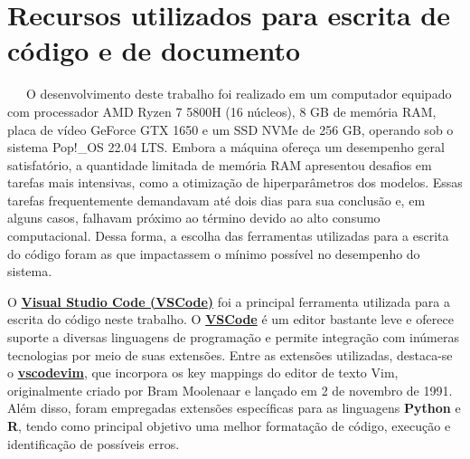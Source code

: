 \documentclass[
  12pt,
  a4paper,
]{scrreprt}
\begin{document}
\section{Recursos utilizados para escrita de código e de
documento}\label{recursos-utilizados-para-escrita-de-cuxf3digo-e-de-documento}

~~~O desenvolvimento deste trabalho foi realizado em um computador
equipado com processador AMD Ryzen 7 5800H (16 núcleos), 8 GB de memória
RAM, placa de vídeo GeForce GTX 1650 e um SSD NVMe de 256 GB, operando
sob o sistema Pop!\_OS 22.04 LTS. Embora a máquina ofereça um desempenho
geral satisfatório, a quantidade limitada de memória RAM apresentou
desafios em tarefas mais intensivas, como a otimização de
hiperparâmetros dos modelos. Essas tarefas frequentemente demandavam até
dois dias para sua conclusão e, em alguns casos, falhavam próximo ao
término devido ao alto consumo computacional. Dessa forma, a escolha das
ferramentas utilizadas para a escrita do código foram as que impactassem
o mínimo possível no desempenho do sistema.

\vspace{12pt}

O \href{https://code.visualstudio.com/}{\textbf{Visual Studio Code
(VSCode)}} foi a principal ferramenta utilizada para a escrita do código
neste trabalho. O \href{https://code.visualstudio.com/}{\textbf{VSCode}}
é um editor bastante leve e oferece suporte a diversas linguagens de
programação e permite integração com inúmeras tecnologias por meio de
suas extensões. Entre as extensões utilizadas, destaca-se o
\href{https://marketplace.visualstudio.com/items?itemName=vscodevim.vim}{\textbf{vscodevim}},
que incorpora os key mappings do editor de texto Vim, originalmente
criado por Bram Moolenaar e lançado em 2 de novembro de 1991. Além
disso, foram empregadas extensões específicas para as linguagens
\textbf{Python} e \textbf{R}, tendo como principal objetivo uma melhor
formatação de código, execução e identificação de possíveis erros.

\vspace{12pt}
\end{document}
